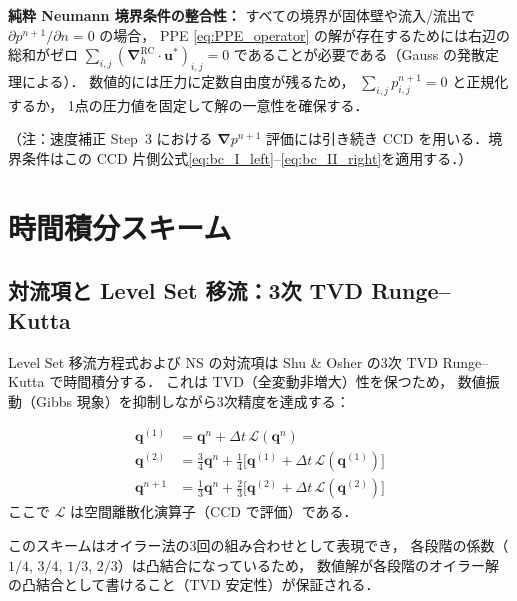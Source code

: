 \documentclass[12pt, a4paper, titlepage]{article}
\newcommand{\jp}[1]{{\normalfont\jpfont #1}}
\newcommand{\bu}{\bm{u}}
\newcommand{\bnabla}{\bm{\nabla}}
\begin{document}
\begin{tcolorbox}[warnbox]
\jp{\textbf{純粋 Neumann 境界条件の整合性：}
すべての境界が固体壁や流入/流出で $\partial p^{n+1}/\partial n = 0$ の場合，
PPE \eqref{eq:PPE_operator} の解が存在するためには右辺の総和がゼロ
$\sum_{i,j} (\bnabla_h^{\mathrm{RC}}\cdot\bu^*)_{i,j} = 0$
であることが必要である（Gauss の発散定理による）．
数値的には圧力に定数自由度が残るため，
$\sum_{i,j} p^{n+1}_{i,j} = 0$ と正規化するか，
1点の圧力値を固定して解の一意性を確保する．}
\end{tcolorbox}

\jp{（注：速度補正 Step~3 における $\bnabla p^{n+1}$ 評価には引き続き CCD を用いる．境界条件はこの CCD 片側公式\eqref{eq:bc_I_left}--\eqref{eq:bc_II_right}を適用する．）}


\section{\jp{時間積分スキーム}}
\label{sec:time}

\subsection{\jp{対流項と Level Set 移流：3次 TVD Runge--Kutta}}

\jp{Level Set 移流方程式および NS の対流項は
Shu \& Osher \cite{ShuOsher1988} の3次 TVD Runge--Kutta で時間積分する．
これは TVD（全変動非増大）性を保つため，
数値振動（Gibbs 現象）を抑制しながら3次精度を達成する：}

\begin{tcolorbox}[mybox, title={3\jp{次} TVD Runge--Kutta \jp{（Shu--Osher スキーム）}}]
\begin{align}
  \bm{q}^{(1)} &= \bm{q}^n + \Delta t\,\mathcal{L}(\bm{q}^n)
  \label{eq:TVDRK3_1}\\[4pt]
  \bm{q}^{(2)} &= \frac{3}{4}\bm{q}^n
               + \frac{1}{4}\bigl[\bm{q}^{(1)} + \Delta t\,\mathcal{L}(\bm{q}^{(1)})\bigr]
  \label{eq:TVDRK3_2}\\[4pt]
  \bm{q}^{n+1} &= \frac{1}{3}\bm{q}^n
               + \frac{2}{3}\bigl[\bm{q}^{(2)} + \Delta t\,\mathcal{L}(\bm{q}^{(2)})\bigr]
  \label{eq:TVDRK3_3}
\end{align}
\jp{ここで $\mathcal{L}$ は空間離散化演算子（CCD で評価）である．}
\end{tcolorbox}

\jp{このスキームはオイラー法の3回の組み合わせとして表現でき，
各段階の係数（$1/4$, $3/4$, $1/3$, $2/3$）は凸結合になっているため，
数値解が各段階のオイラー解の凸結合として書けること（TVD 安定性）が保証される．}
\end{document}
